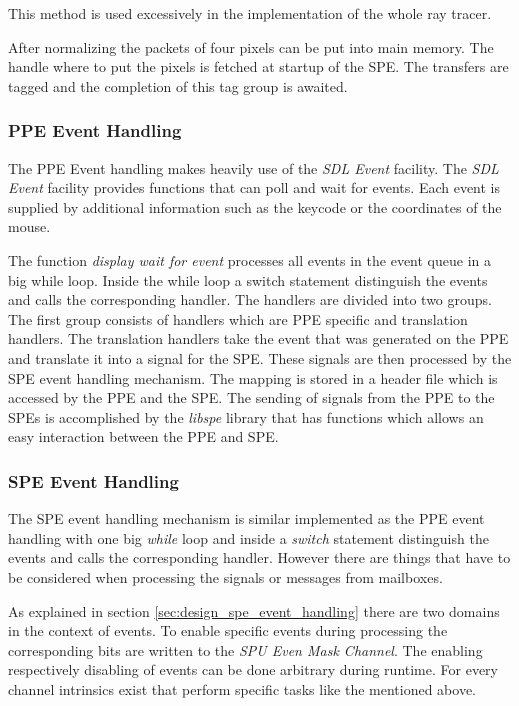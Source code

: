 \documentclass[DIV10, abstracton, openright, footsepline, headsepline, twoside, 9pt,
bigheadings]{scrreprt}
\begin{document}
This method is used excessively in the implementation of the whole ray tracer.

After normalizing the packets of four pixels can be put into main memory. The handle
where to put the pixels is fetched at startup of the SPE. The transfers are tagged and
the completion of this tag group is awaited.



\subsubsection{PPE Event Handling}
\label{sec:impl_ppe_event_handling}
The PPE Event handling makes heavily use of the \textit{SDL Event} facility. The
\textit{SDL Event} facility provides functions that can poll and wait for events.
Each event is supplied by additional information such as the keycode or the coordinates
of the mouse.

The function \textit{display wait for event} processes all events in the event queue
in a big while loop. Inside the while loop a switch statement distinguish the events
and calls the corresponding handler. The handlers are divided into two groups. The
first group consists of handlers which are PPE specific and translation handlers. The
translation handlers take the event that was generated on the PPE and translate it into
a signal for the SPE. These signals are then processed by the SPE event handling mechanism.
The mapping is stored in a header file which is accessed by the PPE and the SPE.
The sending of signals from the PPE to the SPEs is accomplished by the \textit{libspe}
library that has functions which allows an easy interaction between the PPE and SPE.


\subsubsection{SPE Event Handling}
\label{sec:impl_spe_event_handling}

The SPE event handling mechanism is similar implemented as the PPE event handling with one
big \textit{while} loop and inside a \textit{switch} statement distinguish the events
and calls the corresponding handler. However there are things that have to be considered
when processing the signals or messages from mailboxes.

As explained in section \ref{sec:design_spe_event_handling} there are two domains
in the context of events. To enable specific events during processing the corresponding
bits are written to the \textit{SPU Even Mask Channel}. The enabling respectively disabling
of events can be done arbitrary during runtime. For every channel intrinsics exist
that perform specific tasks like the mentioned above.
\end{document}

